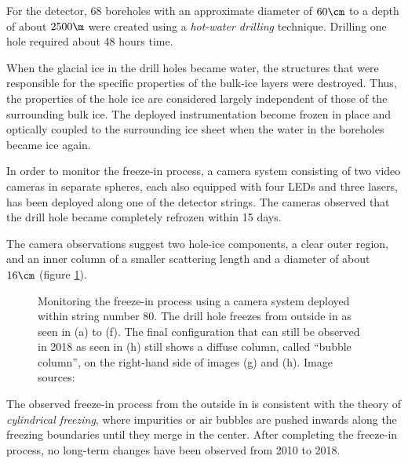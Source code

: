 For the \icecube detector, 68 boreholes with an approximate diameter of $60\cm$ to a depth of about $2500\m$ were created using a \textit{hot-water drilling} technique. Drilling one hole required about 48 hours time. \cite{instrumentation}

When the glacial ice in the drill holes became water, the structures that were responsible for the specific properties of the bulk-ice layers were destroyed. Thus, the properties of the hole ice are considered largely independent of those of the surrounding bulk ice. The deployed instrumentation become frozen in place and optically coupled to the surrounding ice sheet when the water in the boreholes became ice again. \cite{instrumentation}

In order to monitor the freeze-in process, a camera system consisting of two video cameras in separate spheres, each also equipped with four LEDs and three lasers, has been deployed along one of the detector strings. The cameras observed that the drill hole became completely refrozen within 15 days. \cite{instrumentation}

The camera observations suggest two hole-ice components, a clear outer region, and an inner column of a smaller scattering length and a diameter of about $16\cm$ (figure \ref{fig:daeM6yot}). \cite{rongenswedishcamera,instrumentation}

\begin{figure}[htbp]
  \centering
  \hfill
  \hfill
  \hfill
  \hfill
  \hfill
  \hfill
  \hfill
  \hfill
  \caption{Monitoring the freeze-in process using a camera system deployed within string number 80. The drill hole freezes from outside in as seen in (a) to (f). The final configuration that can still be observed in 2018 as seen in (h) still shows a diffuse column, called \enquote{bubble column}, on the right-hand side of images (g) and (h). Image sources: \cite{icrc17pocam, camera2010, camera2018}}
  \label{fig:daeM6yot}
\end{figure}

The observed freeze-in process from the outside in is consistent with the theory of \textit{cylindrical freezing}, where impurities or air bubbles are pushed inwards along the freezing boundaries until they merge in the center. \cite{rongenswedishcamera} After completing the freeze-in process, no long-term changes have been observed from 2010 to 2018. \cite{instrumentation, camera2010, camera2018}

